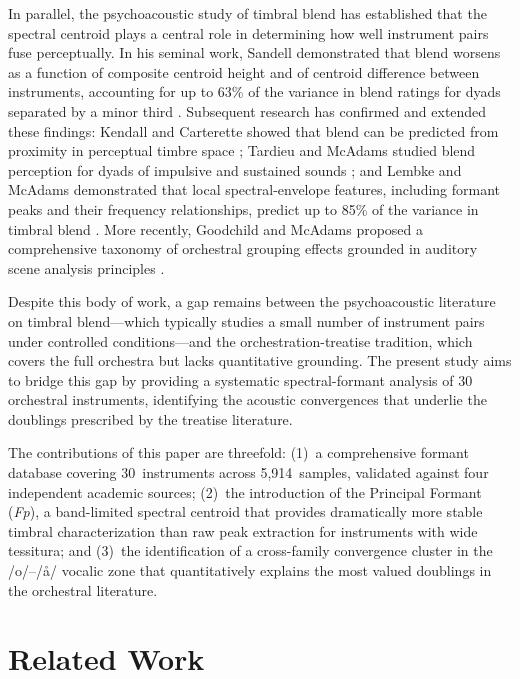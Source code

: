 \documentclass[12pt,a4paper]{article}
\begin{document}
In parallel, the psychoacoustic study of timbral blend has established that the
spectral centroid plays a central role in determining how well instrument pairs
fuse perceptually. In his seminal work, Sandell demonstrated that blend worsens
as a function of composite centroid height and of centroid difference between
instruments, accounting for up to 63\% of the variance in blend ratings for
dyads separated by a minor third \citep{Sandell1991,Sandell1995}. Subsequent
research has confirmed and extended these findings: Kendall and Carterette
showed that blend can be predicted from proximity in perceptual timbre space
\citep{Kendall1993}; Tardieu and McAdams studied blend perception for dyads of
impulsive and sustained sounds \citep{Tardieu2012}; and Lembke and McAdams
demonstrated that local spectral-envelope features, including formant peaks and
their frequency relationships, predict up to 85\% of the variance in timbral
blend \citep{Lembke2017}. More recently, Goodchild and McAdams proposed a
comprehensive taxonomy of orchestral grouping effects grounded in auditory scene
analysis principles \citep{Goodchild2018,McAdams2022}.

Despite this body of work, a gap remains between the psychoacoustic literature
on timbral blend---which typically studies a small number of instrument pairs
under controlled conditions---and the orchestration-treatise tradition, which
covers the full orchestra but lacks quantitative grounding. The present study
aims to bridge this gap by providing a systematic spectral-formant analysis
of 30 orchestral instruments, identifying the acoustic convergences that
underlie the doublings prescribed by the treatise literature.

The contributions of this paper are threefold: (1)~a comprehensive formant
database covering 30~instruments across 5,914~samples, validated against four
independent academic sources; (2)~the introduction of the Principal Formant
(\textit{Fp}), a band-limited spectral centroid that provides dramatically more
stable timbral characterization than raw peak extraction for instruments with
wide tessitura; and (3)~the identification of a cross-family convergence cluster
in the /o/--/\aa/ vocalic zone that quantitatively explains the most valued
doublings in the orchestral literature.

\section{Related Work}
\end{document}
